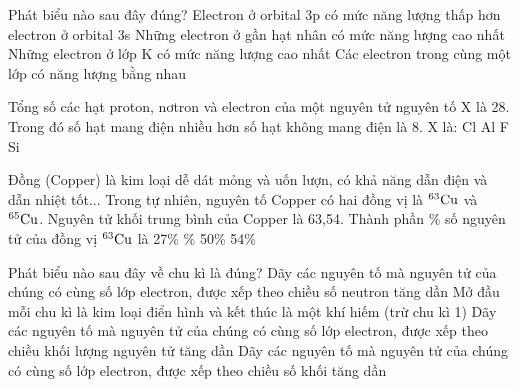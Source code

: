 \documentclass[11pt,a4paper]{article}
\begin{document}
\begin{ex}
Phát biểu nào sau đây đúng?
\choice
{Electron ở orbital 3p có mức năng lượng thấp hơn electron ở orbital 3s}
{Những electron ở gần hạt nhân có mức năng lượng cao nhất}
{\True Những electron ở lớp K có mức năng lượng cao nhất}
{Các electron trong cùng một lớp có năng lượng bằng nhau}

\end{ex}
\begin{ex}
Tổng số các hạt proton, nơtron và electron của một nguyên tử nguyên tố X là 28. Trong đó số hạt mang điện nhiều hơn số hạt không mang điện là 8. X là:
\choice
{Cl}
{Al}
{\True F}
{Si}

\end{ex}
\begin{ex}
Đồng (Copper) là kim loại dễ dát mỏng và uốn lượn, có khả năng dẫn điện và dẫn nhiệt tốt... Trong tự nhiên, nguyên tố Copper có hai đồng vị là $^{63}\ce{Cu}$ và $^{65}\ce{Cu}$. Nguyên tử khối trung bình của Copper là 63,54. Thành phần \% số nguyên tử của đồng vị $^{63}\ce{Cu}$ là
\choice
{27\%}
{\%}
{50\%}
{54\%}

\end{ex}
\begin{ex}
Phát biểu nào sau đây về chu kì là đúng?
\choice
{Dãy các nguyên tố mà nguyên tử của chúng có cùng số lớp electron, được xếp theo chiều số neutron tăng dần}
{\True Mở đầu mỗi chu kì là kim loại điển hình và kết thúc là một khí hiếm (trừ chu kì 1)}
{Dãy các nguyên tố mà nguyên tử của chúng có cùng số lớp electron, được xếp theo chiều khối lượng nguyên tử tăng dần}
{Dãy các nguyên tố mà nguyên tử của chúng có cùng số lớp electron, được xếp theo chiều số khối tăng dần}

\end{ex}
\end{document}
